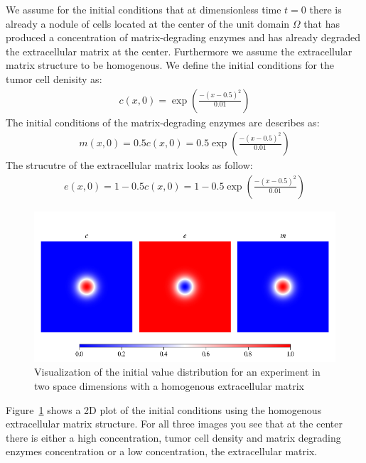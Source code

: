 We assume for the initial conditions that at dimensionless time $t=0$ there is already a nodule of cells located at the center of the unit domain $\Omega$ that has produced a concentration of matrix-degrading enzymes and has already degraded the extracellular matrix at the center. Furthermore we assume the extracellular matrix structure to be homogenous.\newline 
We define the initial conditions for the tumor cell denisity as:
\begin{align*}
    c(x,0)= \exp(\frac{-(x-0.5)^2}{0.01})
\end{align*}
The initial conditions of the matrix-degrading enzymes are describes as:
\begin{align*}
    m(x,0) = 0.5 c(x,0) = 0.5 \exp(\frac{-(x-0.5)^2}{0.01})
\end{align*}
The strucutre of the extracellular matrix looks as follow:
\begin{align*}
    e(x,0) = 1 - 0.5 c(x,0) = 1 - 0.5 \exp(\frac{-(x-0.5)^2}{0.01})
\end{align*}
\begin{figure}[h]
    \centering
    \includegraphics[width=\textwidth]{resources/images/2D_initial_conditions_homogenous_ECM.png}
    \caption{Visualization of the initial value distribution for an experiment in two space dimensions with a homogenous extracellular matrix}
    \label{fig:2D_homogenous_ECM_initial}
\end{figure}
Figure~\ref{fig:2D_homogenous_ECM_initial} shows a 2D plot of the initial conditions using the homogenous extracellular matrix structure. For all three images you see that at the center there is either a high concentration, tumor cell density and matrix degrading enzymes concentration or a low concentration, the extracellular matrix.\newline 

